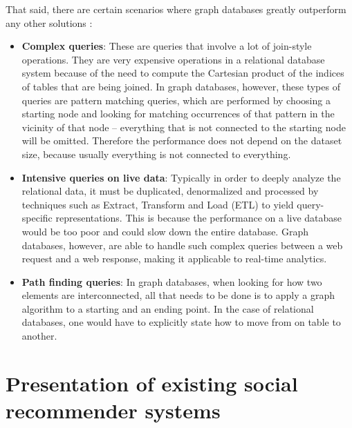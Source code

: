 \documentclass[12pt]{report}
\begin{document}
That said, there are certain scenarios where graph databases greatly outperform any other solutions \cite{learning_neo4j}:
\begin{itemize}
\item {\bf Complex queries}: These are queries that involve a lot of join-style operations. They are very expensive operations in a relational database system because of the need to compute the Cartesian product of the indices of tables that are being joined. In graph databases, however, these types of queries are pattern matching queries, which are performed by choosing a starting node and looking for matching occurrences of that pattern in the vicinity of that node -- everything that is not connected to the starting node will be omitted. Therefore the performance does not depend on the dataset size, because usually everything is not connected to everything. 
\item {\bf Intensive queries on live data}: Typically in order to deeply analyze the relational data, it must be duplicated, denormalized and processed by techniques such as Extract, Transform and Load (ETL) to yield query-specific representations. This is because the performance on a live database would be too poor and could slow down the entire database. Graph databases, however, are able to handle such complex queries between a web request and a web response, making it applicable to real-time analytics.
\item {\bf Path finding queries}: In graph databases, when looking for how two elements are interconnected, all that needs to be done is to apply a graph algorithm to a starting and an ending point. In the case of relational databases, one would have to explicitly state how to move from on table to another.
\end{itemize}




\chapter{Presentation of existing social recommender systems}
\label{ch.presentation_existing}
\end{document}
